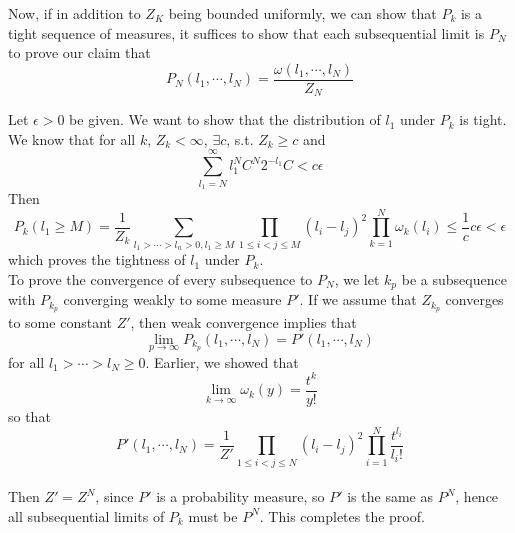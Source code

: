 \documentclass[12pt]{article}
\begin{document}
Now, if in addition to $Z_K$ being bounded uniformly, we can show that $P_k$ is a tight sequence of measures, it suffices to show that each subsequential limit is $P_N$ to prove our claim that
$$P_N(l_1, \cdots, l_N) = \frac{\omega(l_1, \cdots, l_N)}{Z_N}$$

Let $\epsilon > 0$ be given. We want to show that the distribution of $l_1$ under $P_k$ is tight. We know that for all $k$, $Z_k < \infty$, $\exists c$, s.t. $Z_k \geq c$ and 
$$\sum_{l_1 = N}^\infty l_1^N C^N 2^{-l_1} C < c \epsilon$$
Then
$$P_k(l_1 \geq M) = \frac{1}{Z_k} \sum_{l_1 > \cdots > l_n > 0, l_1 \geq M} \prod_{1\leq i < j \leq M}(l_i - l_j)^2 \prod_{k = 1}^N \omega_k(l_i) \leq \frac{1}{c} c \epsilon < \epsilon$$
which proves the tightness of $l_1$ under $P_k$.\\

To prove the convergence of every subsequence to $P_N$, we let $k_p$ be a subsequence with $P_{k_p}$ converging weakly to some measure $P'$. If we assume that $Z_{k_p}$ converges to some constant $Z'$, then weak convergence implies that 
$$\lim_{p \rightarrow \infty} P_{k_p} (l_1, \cdots, l_N) = P'(l_1, \cdots, l_N)$$
for all $l_1 > \cdots > l_N \geq 0$. Earlier, we showed that
$$\lim_{k \rightarrow \infty} \omega_k(y) = \frac{t^k}{y!}$$
so that
$$P'(l_1, \cdots, l_N) = \frac{1}{Z'} \prod_{1 \leq i < j \leq N} (l_i - l_j)^2 \prod_{i = 1}^N \frac{t^{l_i}}{l_i !}$$\\

Then $Z' = Z^N$, since $P'$ is a probability measure, so $P'$ is the same as $P^N$, hence all subsequential limits of $P_k$ must be $P^N$. This completes the proof.
\end{document}
